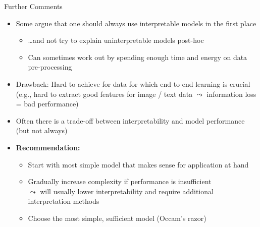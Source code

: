 \documentclass[11pt,compress,t,notes=noshow, aspectratio=169, xcolor=table]{beamer}
\begin{document}
\begin{frame}{Further Comments}

    \begin{itemize}
    \itemsep1em
        \item<1-> Some argue that one should always use interpretable models in the first place 
        \begin{itemize}
            \item \ldots and not try to explain uninterpretable models post-hoc
            \item Can sometimes work out by spending enough time and energy on data pre-processing %
        \end{itemize}
       \item<2->[$\leadsto$] Drawback: Hard to achieve for data for which end-to-end learning is crucial\\ 
        (e.g., hard to extract good features for image / text data $\leadsto$ information loss = bad performance)
        \item<3-> Often there is a trade-off between interpretability and model performance (but not always)
        \item<4-> \textbf{Recommendation:}
        \begin{itemize}
            \item Start with most simple model that makes sense for application at hand
            \item Gradually increase complexity if performance is insufficient\\
            $\leadsto$ will usually lower interpretability and require additional interpretation methods
            \item Choose the most simple, sufficient model (Occam's razor)
        \end{itemize} 
    \end{itemize}

\end{frame}


\endlecture
\end{document}
